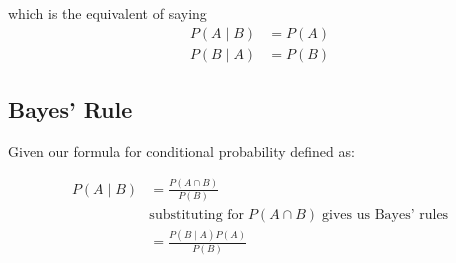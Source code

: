 which is the equivalent of saying
\begin{align*}
	P(A\; |\; B)&=P(A) \\
	P(B\; |\; A)&=P(B)
\end{align*}

\subsection{Bayes' Rule}

Given our formula for conditional probability defined as:

\begin{align*}
	P(A\; |\; B)&=\frac {P(A\cap B)}{P(B)} \\
	& \textrm{substituting for}\; P(A\cap B) \; \textrm{gives us Bayes' rules} \\
	&=\frac {P(B\; |\; A)P(A)}{P(B)}
\end{align*}


